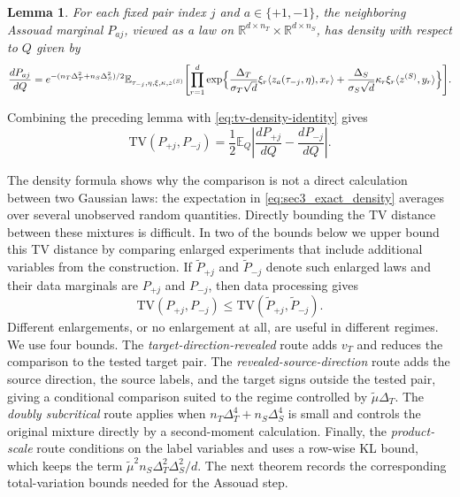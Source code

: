 \documentclass[10pt]{article}
\newtheorem{lemma}{Lemma}
\newcommand{\R}{\mathbb R}
\newcommand{\Ebb}{\mathbb E}
\newcommand{\ip}[2]{\langle #1,#2\rangle}
\newcommand{\TV}{\mathrm{TV}}
\newcommand{\trg}{T}
\newcommand{\nT}{n_{\trg}}
\newcommand{\sigmaT}{\sigma_{\trg}}
\newcommand{\DeltaT}{\Delta_{\trg}}
\newcommand{\src}{S}
\newcommand{\nS}{n_{\src}}
\newcommand{\sigmaS}{\sigma_{\src}}
\newcommand{\zsrc}{z^{(\src)}}
\newcommand{\DeltaS}{\Delta_{\src}}
\begin{document}
\begin{lemma}
\label{lem:sec3_exact_tv_form}
For each fixed pair index $j$ and $a\in\{+1,-1\}$, the neighboring Assouad
marginal $P_{aj}$, viewed as a law on
$\R^{d\times \nT}\times\R^{d\times \nS}$, has density with respect to $Q$
given by
\begin{align}
    \frac{dP_{aj}}{dQ}
    =e^{-(\nT\DeltaT^2+\nS\DeltaS^2)/2}
    \Ebb_{\tau_{-j},\eta,\xi,\kappa,\zsrc}
    \Biggl[
        \prod_{r=1}^d
        \exp\Bigl\{
            \frac{\DeltaT}{\sigmaT\sqrt d}\xi_r
            \ip{z_a(\tau_{-j},\eta)}{x_r}
            +
            \frac{\DeltaS}{\sigmaS\sqrt d}\kappa_r\xi_r
            \ip{\zsrc}{y_r}
        \Bigr\}
    \Biggr]. \nonumber\\
    \label{eq:sec3_exact_density}
\end{align}
\end{lemma}
Combining the preceding lemma with \eqref{eq:tv-density-identity} gives
\begin{equation}
    \label{eq:sec3_tv_exact}
    \TV(P_{+j},P_{-j})
    =
    \frac12
    \Ebb_Q\left|
        \frac{dP_{+j}}{dQ}
        -
        \frac{dP_{-j}}{dQ}
    \right|.
\end{equation}

The density formula shows why the comparison is not a direct calculation
between two Gaussian laws: the expectation in \eqref{eq:sec3_exact_density}
averages over several unobserved random quantities. Directly bounding the TV
distance between these mixtures is difficult. In two of the bounds below we
upper bound this TV distance by comparing enlarged experiments that include
additional variables from the construction. If $\widetilde P_{+j}$ and
$\widetilde P_{-j}$ denote such enlarged laws and their data marginals are
$P_{+j}$ and $P_{-j}$, then data processing gives
\[
    \TV(P_{+j},P_{-j})
    \le
    \TV(\widetilde P_{+j},\widetilde P_{-j}).
\]
Different enlargements, or no enlargement at all, are useful in different
regimes. We use four bounds. The \emph{target-direction-revealed} route adds
$v_{\trg}$ and reduces the comparison to the tested target pair. The
\emph{revealed-source-direction} route adds the source direction, the source
labels, and the target signs outside the tested pair, giving a conditional
comparison suited to the regime controlled by $\tilde\mu\DeltaT$. The
\emph{doubly subcritical} route applies when
$\nT\DeltaT^4+\nS\DeltaS^4$ is small and controls the original mixture directly
by a second-moment calculation. Finally, the \emph{product-scale} route
conditions on the label variables and uses a row-wise KL bound, which keeps
the term $\tilde\mu^2\nS\DeltaT^2\DeltaS^2/d$. The next theorem records the
corresponding total-variation bounds needed for the Assouad step.
\end{document}
